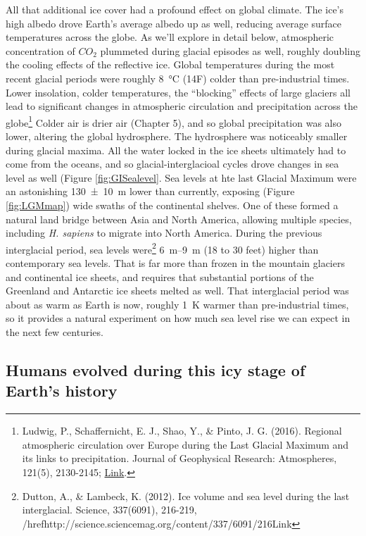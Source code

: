 All that additional ice cover had a profound effect on global climate. The ice's high albedo drove Earth's average albedo up as well, reducing average surface temperatures across the globe. As we'll explore in detail below, atmospheric concentration of $CO_2$ plummeted during glacial episodes as well, roughly doubling the cooling effects of the reflective ice. Global temperatures during the most recent glacial periods were roughly \SI{8}{\celsius} (14\textdegree F) colder than pre-industrial times. Lower insolation, colder temperatures, the ``blocking'' effects of large glaciers all lead to significant changes in atmospheric circulation and precipitation across the globe\footnote{Ludwig, P., Schaffernicht, E. J., Shao, Y., \& Pinto, J. G. (2016). Regional atmospheric circulation over Europe during the Last Glacial Maximum and its links to precipitation. Journal of Geophysical Research: Atmospheres, 121(5), 2130-2145; \href{https://agupubs.onlinelibrary.wiley.com/doi/pdf/10.1002/2015JD024444}{Link}.} Colder air is drier air (Chapter 5), and so global precipitation was also lower, altering the global hydrosphere. The hydrosphere was noticeably smaller during glacial maxima. All the water locked in the ice sheets ultimately had to come from the oceans, and so glacial-interglacioal cycles drove changes in sea level as well (Figure \ref{fig:GISealevel}. Sea levels at hte last Glacial Maximum were an astonishing \SI{130(10)}{\metre} lower than currently, exposing (Figure \ref{fig:LGMmap}) wide swaths of the continental shelves. One of these formed a natural land bridge between Asia and North America, allowing multiple species, including \textit{H. sapiens} to migrate into North America. During the previous interglacial period, sea levels were\footnote{Dutton, A., \& Lambeck, K. (2012). Ice volume and sea level during the last interglacial. Science, 337(6091), 216-219, /href{http://science.sciencemag.org/content/337/6091/216}{Link}} \SIrange{6}{9}{\metre} (18 to 30 feet) higher than contemporary sea levels. That is far more than frozen in the mountain glaciers and continental ice sheets, and requires that substantial portions of the Greenland and Antarctic ice sheets melted as well. That interglacial period was about as warm as Earth is now, roughly \SI{1}{\kelvin} warmer than pre-industrial times, so it provides a natural experiment on how much sea level rise we can expect in the next few centuries.   
\subsection{Humans evolved during this icy stage of Earth's history} 
